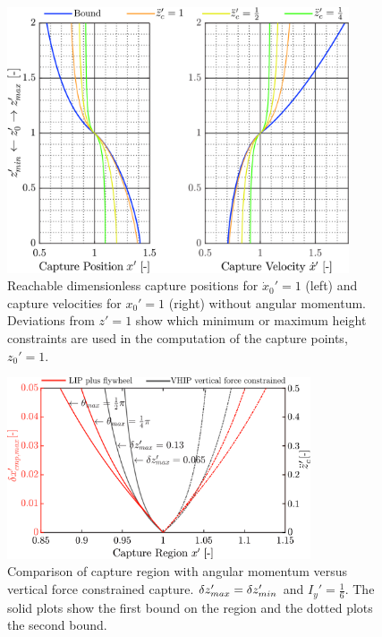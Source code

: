 \begin{figure}
      \centering
      \includegraphics[width=0.9\textwidth]{STYLESTUFF/caplimits2.png}
      \caption{Reachable dimensionless capture positions for $\dot{x}_0'=1$ (left) and capture velocities for $x_0' = 1$ (right) without angular momentum. Deviations from $z'=1$ show which minimum or maximum height constraints are used in the computation of the capture points, $z_0'=1$.}
      \label{fig:caplimits}
\end{figure}
\begin{figure}
\centering
\includegraphics[width=0.8\textwidth]{STYLESTUFF/capcompare.png}
\caption{Comparison of capture region with angular momentum versus vertical force constrained capture. $\delta z_{max}' =\delta z_{min}'$ and $I_y' = \frac{1}{6}$. The solid plots show the first bound on the region and the dotted plots the second bound.}
\label{fig:capcompare}
\end{figure}

